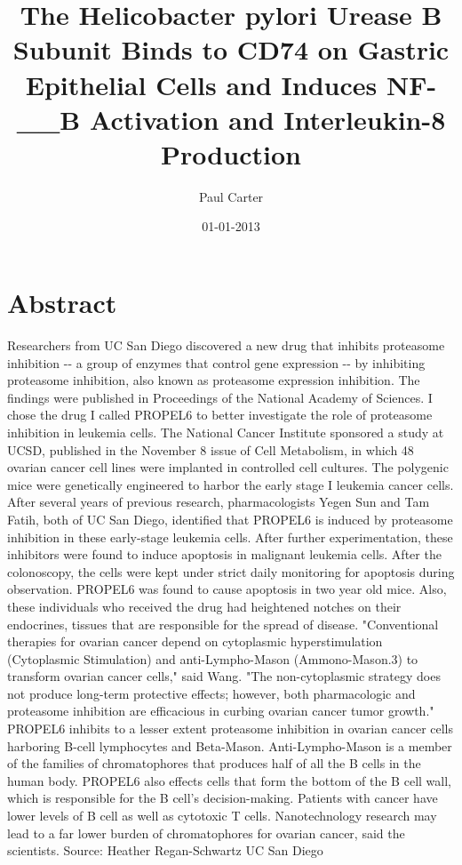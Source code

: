 \documentclass{article}%
\title{The Helicobacter pylori Urease B Subunit Binds to CD74 on Gastric Epithelial Cells and Induces NF{-}\_\_B Activation and Interleukin{-}8 Production}%
\author{Paul Carter}%
\affil{Bellvitge Biomedical Research Institute (IDIBELL), Barcelona, Spain}%
\date{01{-}01{-}2013}%
\begin{document}
%
\normalsize%
\maketitle%
\section{Abstract}%
\label{sec:Abstract}%
Researchers from UC San Diego discovered a new drug that inhibits proteasome inhibition {-}{-} a group of enzymes that control gene expression {-}{-} by inhibiting proteasome inhibition, also known as proteasome expression inhibition. The findings were published in Proceedings of the National Academy of Sciences.\newline%
I chose the drug I called PROPEL6 to better investigate the role of proteasome inhibition in leukemia cells. The National Cancer Institute sponsored a study at UCSD, published in the November 8 issue of Cell Metabolism, in which 48 ovarian cancer cell lines were implanted in controlled cell cultures. The polygenic mice were genetically engineered to harbor the early stage I leukemia cancer cells.\newline%
After several years of previous research, pharmacologists Yegen Sun and Tam Fatih, both of UC San Diego, identified that PROPEL6 is induced by proteasome inhibition in these early{-}stage leukemia cells. After further experimentation, these inhibitors were found to induce apoptosis in malignant leukemia cells.\newline%
After the colonoscopy, the cells were kept under strict daily monitoring for apoptosis during observation. PROPEL6 was found to cause apoptosis in two year old mice. Also, these individuals who received the drug had heightened notches on their endocrines, tissues that are responsible for the spread of disease.\newline%
"Conventional therapies for ovarian cancer depend on cytoplasmic hyperstimulation (Cytoplasmic Stimulation) and anti{-}Lympho{-}Mason (Ammono{-}Mason.3) to transform ovarian cancer cells," said Wang. "The non{-}cytoplasmic strategy does not produce long{-}term protective effects; however, both pharmacologic and proteasome inhibition are efficacious in curbing ovarian cancer tumor growth."\newline%
PROPEL6 inhibits to a lesser extent proteasome inhibition in ovarian cancer cells harboring B{-}cell lymphocytes and Beta{-}Mason. Anti{-}Lympho{-}Mason is a member of the families of chromatophores that produces half of all the B cells in the human body.\newline%
PROPEL6 also effects cells that form the bottom of the B cell wall, which is responsible for the B cell's decision{-}making. Patients with cancer have lower levels of B cell as well as cytotoxic T cells. Nanotechnology research may lead to a far lower burden of chromatophores for ovarian cancer, said the scientists.\newline%
Source:\newline%
Heather Regan{-}Schwartz\newline%
UC San Diego
\end{document}
